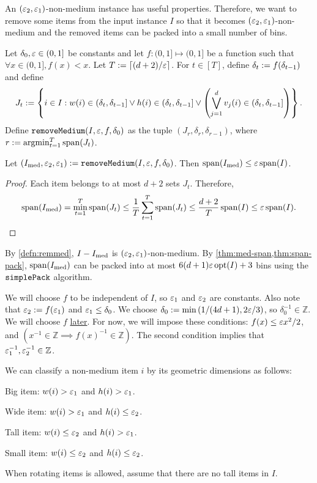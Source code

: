 An $(\varepsilon_2, \varepsilon_1)$-non-medium instance has useful properties.
Therefore, we want to remove some items from the input instance $I$
so that it becomes $(\varepsilon_2, \varepsilon_1)$-non-medium and the removed items
can be packed into a small number of bins.

\begin{definition}
\label{defn:remmed}
Let $\delta_0, \varepsilon \in (0, 1]$ be constants and let
$f: (0, 1] \mapsto (0, 1]$ be a function such that $\forall x \in (0, 1], f(x) < x$.
Let $T := \left\lceil (d+2)/\varepsilon \right\rceil$.
For $t \in [T]$, define $\delta_t := f(\delta_{t-1})$ and define
\[ J_t := \left\{i \in I: w(i) \in (\delta_t,\delta_{t-1}] \vee h(i) \in (\delta_t,\delta_{t-1}]
    \vee \left(\bigvee_{j=1}^d v_j(i) \in (\delta_t,\delta_{t-1}]\right)\right\}. \]
Define $\operatorname{\mathtt{removeMedium}}(I, \varepsilon, f, \delta_0)$ as the tuple $(J_r, \delta_r, \delta_{r-1})$,
where $r := \operatorname*{argmin}_{t=1}^T \operatorname{span}(J_t)$.
\end{definition}

\begin{lemma}
\label{thm:med-span}
Let $(I_{\mathrm{med}}, \varepsilon_2, \varepsilon_1) := \operatorname{\mathtt{removeMedium}}(I, \varepsilon, f, \delta_0)$.
Then $\operatorname{span}(I_{\mathrm{med}}) \le \varepsilon\operatorname{span}(I)$.
\end{lemma}
\begin{proof}
Each item belongs to at most $d+2$ sets $J_t$. Therefore,
\[ \operatorname{span}(I_{\mathrm{med}}) = \min_{t=1}^T \operatorname{span}(J_t)
\le \frac{1}{T} \sum_{t=1}^T \operatorname{span}(J_t)
\le \frac{d+2}{T} \operatorname{span}(I)
\le \varepsilon \operatorname{span}(I). \qedhere \]
\end{proof}
By \cref{defn:remmed}, $I - I_{\mathrm{med}}$ is $(\varepsilon_2, \varepsilon_1)$-non-medium.
By \cref{thm:med-span,thm:span-pack}, $\operatorname{span}(I_{\mathrm{med}})$ can be packed into
at most $6(d+1)\varepsilon\operatorname{opt}(I) + 3$ bins using the $\operatorname{\mathtt{simplePack}}$ algorithm.

We will choose $f$ to be independent of $I$, so $\varepsilon_1$ and $\varepsilon_2$ are constants.
Also note that $\varepsilon_2 := f(\varepsilon_1)$ and $\varepsilon_1 \le \delta_0$.
We choose ${\delta_0 := \min\left(1/(4d+1), 2\varepsilon/3\right) }$,
so $\delta_0^{-1} \in \mathbb{Z}$.
We will choose $f$ \hyperref[eqn:remmed-f]{later}. For now, we will impose these conditions:
$f(x) \le \varepsilon x^2/2$, and $(x^{-1} \in \mathbb{Z} \implies f(x)^{-1} \in \mathbb{Z})$.
The second condition implies that $\varepsilon_1^{-1}, \varepsilon_2^{-1} \in \mathbb{Z}$.

\begin{definition}
We can classify a non-medium item $i$ by its geometric dimensions as follows:
\begin{tightemize}
\item Big item: $w(i) > \varepsilon_1$ and $h(i) > \varepsilon_1$.
\item Wide item: $w(i) > \varepsilon_1$ and $h(i) \le \varepsilon_2$.
\item Tall item: $w(i) \le \varepsilon_2$ and $h(i) > \varepsilon_1$.
\item Small item: $w(i) \le \varepsilon_2$ and $h(i) \le \varepsilon_2$.
\end{tightemize}
\end{definition}
When rotating items is allowed, assume \wLoG{} that there are no tall items in $I$.

